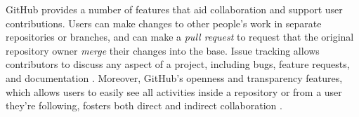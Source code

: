GitHub provides a number of features that aid collaboration and support user contributions. Users can make changes to other people's work in separate repositories or branches, and can make a \emph{pull request} to request that the original repository owner \emph{merge} their changes into the base. Issue tracking allows contributors to discuss any aspect of a project, including bugs, feature requests, and documentation \cite{bissyande2013got}. Moreover, GitHub's openness and transparency features, which allows users to easily see all activities inside a repository or from a user they're following, fosters both direct and indirect collaboration \cite{dabbish2012social}.

